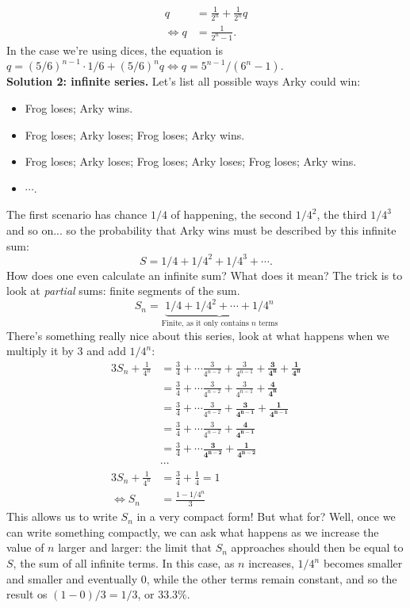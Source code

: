 \documentclass[11pt]{scrartcl}
\begin{document}
\begin{enumerate}[label=\textbf{C\arabic*}.]
    \begin{align*}
    q &= \frac{1}{2^n} + \frac{1}{2^n}q\\
    \Leftrightarrow q &= \boxed{\frac{1}{2^n-1}}.
    \end{align*}
    In the case we're using dices, the equation is $q = (5/6)^{n-1}\cdot 1/6 + (5/6)^n q \Leftrightarrow q = 5^{n-1}/(6^n-1)$.\\
    \textbf{Solution 2: infinite series.}
    Let's list all possible ways Arky could win:
    \begin{itemize}
        \item Frog loses; Arky wins.
        \item Frog loses; Arky loses; Frog loses; Arky wins.
        \item Frog loses; Arky loses; Frog loses; Arky loses; Frog loses; Arky wins.
        \item $\cdots$.
    \end{itemize}
    The first scenario has chance $1/4$ of happening, the second $1/4^2$, the third $1/4^3$ and so on... so the probability that Arky wins must be described by this infinite sum:
    $$S = 1/4 + 1/4^2 + 1/4^3 + \cdots.$$
    How does one even calculate an infinite sum? What does it mean? The trick is to look at \textit{partial} sums: finite segments of the sum.
    $$S_n = \underbrace{1/4 + 1/4^2 + \cdots + 1/4^n}_\text{Finite, as it only contains $n$ terms}$$
    There's something really nice about this series, look at what happens when we multiply it by $3$ and add $1/4^n$:
    \begin{align*}
        3S_n + \frac1{4^n} &= \frac34 + \cdots \frac3{4^{n-2}} + \frac3{4^{n-1}} + \mathbf{\frac3{4^n} + \frac{1}{4^n}}\\
        &= \frac34 + \cdots \frac3{4^{n-2}} + \frac3{4^{n-1}} + \mathbf{\frac4{4^n}}\\
        &= \frac34 + \cdots \frac3{4^{n-2}} + \mathbf{\frac3{4^{n-1}} + \frac1{4^{n-1}}}\\
        &= \frac34 + \cdots \frac3{4^{n-2}} + \mathbf{\frac4{4^{n-1}}} \\
        &= \frac34 + \cdots \mathbf{\frac3{4^{n-2}} + \frac1{4^{n-2}}} \\
        &\cdots\\
        3S_n + \frac1{4^n} &= \frac{3}{4} + \frac{1}{4} = 1\\
        \Leftrightarrow S_n &= \frac{1-1/4^n}{3}
    \end{align*}
    This allows us to write $S_n$ in a very compact form! But what for? Well, once we can write something compactly, we can ask what happens as we increase the value of $n$ larger and larger: the limit that $S_n$ approaches should then be equal to $S$, the sum of all infinite terms. In this case, as $n$ increases, $1/4^n$ becomes smaller and smaller and eventually $0$, while the other terms remain constant, and so the result os $(1-0)/3 = \boxed{1/3}$, or $33.3\%$.\\

\end{enumerate}
\end{document}
